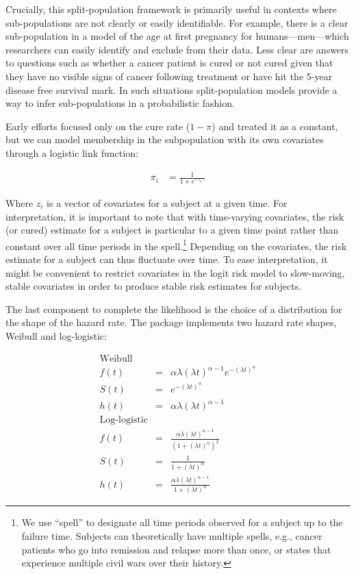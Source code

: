\documentclass[article]{jss}
\begin{document}
Crucially, this split-population framework is primarily useful in
contexts where sub-populations are not clearly or easily identifiable.
For example, there is a clear sub-population in a model of the age at
first pregnancy for humans---men---which researchers can easily identify
and exclude from their data. Less clear are answers to questions such as
whether a cancer patient is cured or not cured given that they have no
visible signs of cancer following treatment or have hit the 5-year
disease free survival mark. In such situations split-population models
provide a way to infer sub-populations in a probabilistic fashion.

Early efforts focused only on the cure rate (\(1 - \pi\)) and treated it
as a constant, but we can model membership in the subpopulation with its
own covariates through a logistic link function:

\begin{align}
\pi_i &= \frac{1}{1 + e^{-z_i \gamma}}
\end{align}

Where \(z_i\) is a vector of covariates for a subject at a given time.
For interpretation, it is important to note that with time-varying
covariates, the risk (or cured) estimate for a subject is particular to
a given time point rather than constant over all time periods in the
spell.\footnote{We use ``spell'' to designate all time periods observed for a subject up to the failure time. Subjects can theoretically have multiple spells, e.g., cancer patients who go into remission and relapse more than once, or states that experience multiple civil wars over their history.}
Depending on the covariates, the risk estimate for a subject can thus
fluctuate over time. To ease interpretation, it might be convenient to
restrict covariates in the logit risk model to slow-moving, stable
covariates in order to produce stable risk estimates for subjects.

The last component to complete the likelihood is the choice of a
distribution for the shape of the hazard rate. The 
package implements two hazard rate shapes, Weibull and log-logistic:

\begin{eqnarray*}
\textrm{Weibull} \\
 f(t) & = & \alpha \lambda (\lambda t)^{\alpha - 1} e^{-(\lambda t)^\alpha} \\
  S(t) & = & e^{ -(\lambda t )^\alpha } \\
 h(t) & = & \alpha \lambda (\lambda t)^{\alpha-1} \\
\textrm{Log-logistic} \\
 f(t) & = & \frac{ \alpha \lambda (\lambda t)^{\alpha-1} }{ (1 + (\lambda t)^\alpha)^2 } \\
 S(t) & = & \frac{1}{ 1+  (\lambda t)^\alpha }  \\
 h(t) & = & \frac{ \alpha \lambda (\lambda t)^{\alpha-1} }{ 1+  (\lambda t)^\alpha }
\end{eqnarray*}
\end{document}
